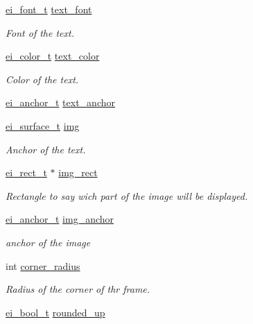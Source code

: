 \begin{DoxyCompactItemize}
\hyperlink{ei__types_8h_a22c8198e4d641e4bc67bb17f9c6bcda7}{ei\+\_\+font\+\_\+t} \hyperlink{structei__frame__t_a9ecc6a5030ccee171098b953014b1798}{text\+\_\+font}
\begin{DoxyCompactList}\small\item\em Font of the text. \end{DoxyCompactList}\item 
\hyperlink{structei__color__t}{ei\+\_\+color\+\_\+t} \hyperlink{structei__frame__t_adf806a6e4efd6a6fb28a286344c3448c}{text\+\_\+color}
\begin{DoxyCompactList}\small\item\em Color of the text. \end{DoxyCompactList}\item 
\hyperlink{ei__types_8h_a3852c963af609d31d7cfcff79c4c8450}{ei\+\_\+anchor\+\_\+t} \hyperlink{structei__frame__t_a54264b4e7016d27c03e59da289d079fb}{text\+\_\+anchor}
\item 
\hyperlink{hw__interface_8h_ad9970ae727c438faaf09c58c5defb796}{ei\+\_\+surface\+\_\+t} \hyperlink{structei__frame__t_ae973c0cde8752c6d02f507930ab67654}{img}
\begin{DoxyCompactList}\small\item\em Anchor of the text. \end{DoxyCompactList}\item 
\hyperlink{structei__rect__t}{ei\+\_\+rect\+\_\+t} $\ast$ \hyperlink{structei__frame__t_a6758a232474fa8b8469ecbc92c699f15}{img\+\_\+rect}
\begin{DoxyCompactList}\small\item\em Rectangle to say wich part of the image will be displayed. \end{DoxyCompactList}\item 
\hyperlink{ei__types_8h_a3852c963af609d31d7cfcff79c4c8450}{ei\+\_\+anchor\+\_\+t} \hyperlink{structei__frame__t_a76fefc2cd628d20d2de79f96c12996a5}{img\+\_\+anchor}
\begin{DoxyCompactList}\small\item\em anchor of the image \end{DoxyCompactList}\item 
int \hyperlink{structei__frame__t_aa8e559bc95c985c05d82e0e5f9cd6768}{corner\+\_\+radius}
\begin{DoxyCompactList}\small\item\em Radius of the corner of thr frame. \end{DoxyCompactList}\item 
\hyperlink{ei__types_8h_a383b9af13bd6a0a893096ead3c4d8e28}{ei\+\_\+bool\+\_\+t} \hyperlink{structei__frame__t_a4e35bcc8ad8edb5032d7dce24f419928}{rounded\+\_\+up}

\end{DoxyCompactItemize}
